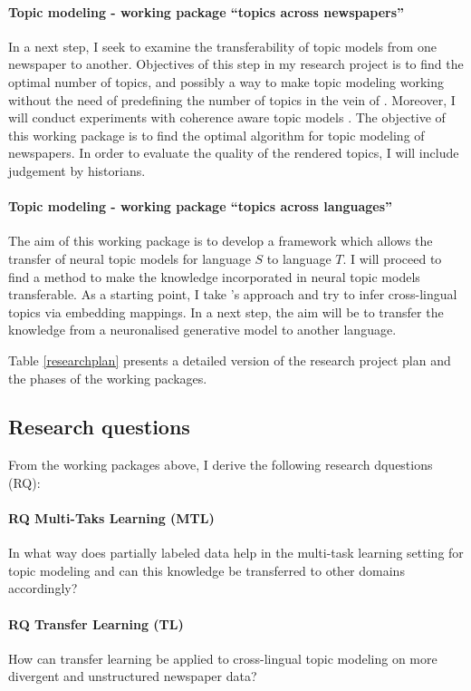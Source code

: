 \paragraph{Topic modeling - working package ``topics across newspapers''} In a next step, I seek to examine the transferability of topic models from one newspaper to another. Objectives of this step in my research project is to find the optimal number of topics, and possibly a way to make topic modeling working without the need of predefining the number of topics in the vein of \citet{miao_neural_2016}. Moreover, I will conduct experiments with coherence aware topic models \citep{2018arXiv180902687D}. The objective of this working package is to find the optimal algorithm for topic modeling of newspapers. In order to evaluate the quality of the rendered topics, I will include judgement by historians. 

\paragraph{Topic modeling - working package ``topics across languages''} The aim of this working package is to develop a framework which allows the transfer of neural topic models for language $S$ to language $T$. I will proceed to find a method to make the knowledge incorporated in neural topic models transferable. As a starting point, I take \citet{Moody16}'s approach and try to infer cross-lingual topics via embedding mappings. In a next step, the aim will be to transfer the knowledge from a neuronalised generative model to another language.

Table \ref{researchplan} presents a detailed version of the research project plan and the phases of the working packages.

\subsection{Research questions}
From the working packages above, I derive the following research dquestions (RQ):

\paragraph{RQ Multi-Taks Learning (MTL)} In what way does partially labeled data help in the multi-task learning setting for topic modeling and can this knowledge be transferred  to other domains accordingly?

\paragraph{RQ Transfer Learning (TL)} How can transfer learning be applied to cross-lingual topic modeling on more divergent and unstructured newspaper data?

